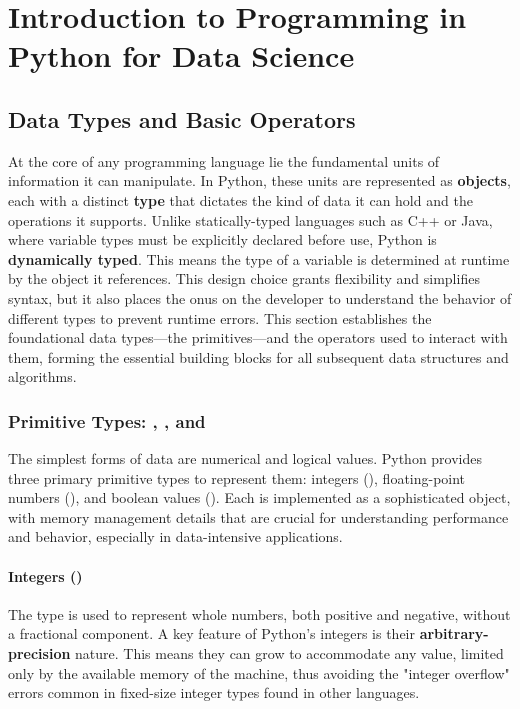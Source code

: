 \chapter{Introduction to Programming in Python for Data Science}
\label{chap:python_intro}

\section{Data Types and Basic Operators}
\label{sec:data_types_operators}

At the core of any programming language lie the fundamental units of information it can manipulate. In Python, these units are represented as \textbf{objects}, each with a distinct \textbf{type} that dictates the kind of data it can hold and the operations it supports. Unlike statically-typed languages such as C++ or Java, where variable types must be explicitly declared before use, Python is \textbf{dynamically typed}. This means the type of a variable is determined at runtime by the object it references. This design choice grants flexibility and simplifies syntax, but it also places the onus on the developer to understand the behavior of different types to prevent runtime errors. This section establishes the foundational data types—the primitives—and the operators used to interact with them, forming the essential building blocks for all subsequent data structures and algorithms.

\subsection{Primitive Types: , , and }
\label{subsec:primitive_types}
The simplest forms of data are numerical and logical values. Python provides three primary primitive types to represent them: integers (), floating-point numbers (), and boolean values (). Each is implemented as a sophisticated object, with memory management details that are crucial for understanding performance and behavior, especially in data-intensive applications.

\subsubsection*{Integers ()}
The  type is used to represent whole numbers, both positive and negative, without a fractional component. A key feature of Python's integers is their \textbf{arbitrary-precision} nature. This means they can grow to accommodate any value, limited only by the available memory of the machine, thus avoiding the "integer overflow" errors common in fixed-size integer types found in other languages.

